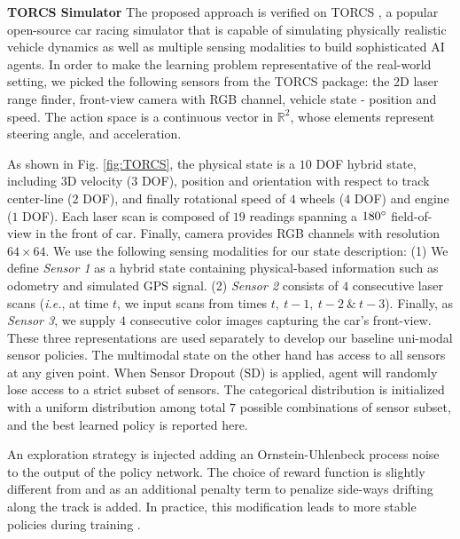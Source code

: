 \documentclass[../thesis.tex]{subfiles}
\begin{document}
\textbf{TORCS Simulator}
The proposed approach is verified on TORCS \cite{wymann2000torcs}, a popular open-source car racing simulator that is capable of simulating physically realistic vehicle dynamics as well as multiple sensing modalities \cite{GymTORCS} to build sophisticated AI agents. In order to make the learning problem representative of the real-world setting, we picked the following sensors from the TORCS package: the 2D laser range finder, front-view camera with RGB channel, vehicle state - position and speed. The action space is a continuous vector in $\mathbb{R}^2$, whose elements represent steering angle, and acceleration.
 
As shown in Fig. \ref{fig:TORCS}, the physical state is a $10$ DOF hybrid state, including $3$D velocity ($3$ DOF), position and orientation with respect to track center-line ($2$ DOF), and finally rotational speed of $4$ wheels ($4$ DOF) and engine ($1$ DOF). Each laser scan is composed of $19$ readings spanning a $180\degree$ field-of-view in the front of car. Finally, camera provides RGB channels with resolution $64 \times 64$. We use the following sensing modalities for our state description: (1) We define \emph{Sensor 1} as a hybrid state containing physical-based information such as odometry and simulated GPS signal. (2) \emph{Sensor 2} consists of $4$ consecutive laser scans (\textit{i.e.}, at time $t$, we input scans from times $t,~ t-1,~t-2~\&~t-3$). Finally, as \emph{Sensor 3}, we supply $4$ consecutive color images capturing the car's front-view. These three representations are used separately to develop our baseline uni-modal sensor policies. The multimodal state on the other hand has access to all sensors at any given point. When Sensor Dropout (SD) is applied, agent will randomly lose access to a strict subset of sensors. The categorical distribution is initialized with a uniform distribution among total $7$ possible combinations of sensor subset, and the best learned policy is reported here.
 
An exploration strategy is injected adding an Ornstein-Uhlenbeck process noise \cite{uhlenbeck1930theory} to the output of the policy network. The choice of reward function is slightly different from  \citet{DBLP:journals/corr/LillicrapHPHETS15} and \citet{A3C} as an additional penalty term to penalize side-ways drifting along the track is added. In practice, this modification leads to more stable policies during training \cite{BenLau16}.
 
\end{document}
